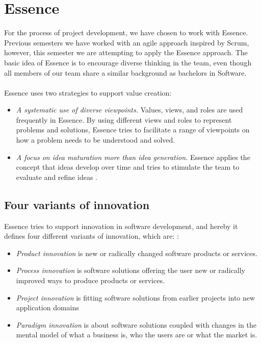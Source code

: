 \section{Essence} \label{sec:essence}
For the process of project development, we have chosen to work with Essence. 
Previous semesters we have worked with an agile approach inspired by Scrum, however, this semester we are attempting to apply the Essence approach.
The basic idea of Essence is to encourage diverse thinking in the team, even though all members of our team share a similar background as bachelors in Software.
\\\\
Essence uses two strategies to support value creation:
\begin{itemize}
    \item \textit{A systematic use of diverse viewpoints.} 
    Values, views, and roles are used frequently in Essence. 
    By using different views and roles to represent problems and solutions, Essence tries to facilitate a range of viewpoints on how a problem needs to be understood and solved.
    \item \textit{A focus on idea maturation more than idea generation.}
    Essence applies the concept that ideas develop over time and tries to stimulate the team to evaluate and refine ideas \autocite{Essence}.
\end{itemize}

\subsection{Four variants of innovation}
Essence tries to support innovation in software development, and hereby it defines four different variants of innovation, which are: \autocite{Essence}:
\begin{itemize}
    \item \textit{Product innovation} is new or radically changed software products or services. 
    \item \textit{Process innovation} is software solutions offering the user new or radically improved ways to produce products or services.
    \item \textit{Project innovation} is fitting software solutions from earlier projects into new application domains
    \item \textit{Paradigm innovation} is about software solutions coupled with changes in the mental model of what a business is, who the users are or what the market is.
\end{itemize}

